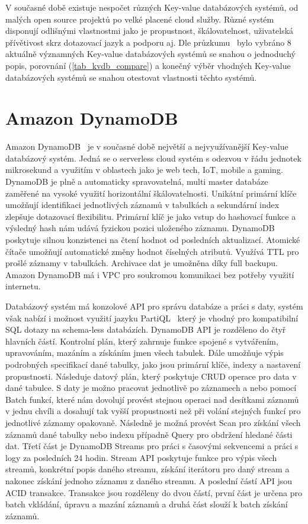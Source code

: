 \documentclass[czech,master,dept460,male,csharp,cpdeclaration]{diploma}
\begin{document}
	V současné době existuje nespočet různých Key-value databázových systémů, od malých open source projektů po velké placené cloud služby. Různé systém disponují odlišnými vlastnostmi jako je propustnost, škálovatelnost, uživatelská přívětivost skrz dotazovací jazyk a podporu aj. Dle průzkumu~\cite{predictiveanalyticstoday,g2,db-engineers-ranking} bylo vybráno 8 aktuálně významných Key-value databázových systémů se snahou o jednoduchý popis, porovnání (\ref{tab_kvdb_compare}) a konečný výběr vhodných Key-value databázových systémů se snahou otestovat vlastnosti těchto systémů.
	
	\section{Amazon DynamoDB}
	
	Amazon DynamoDB~\cite{dynamodb} je v současné době největší a nejvyužívanější Key-value databázový systém. Jedná se o serverless cloud systém s odezvou v řádu jednotek mikrosekund a využitím v oblastech jako je web tech, IoT, mobile a gaming. DynamoDB je plně a automaticky spravovatelná, multi master databáze zaměřené na vysoké využití horizontální škálovatelnosti. Unikátní primární klíče umožňují identifikaci jednotlivých záznamů v tabulkách a sekundární index zlepšuje dotazovací flexibilitu. Primární klíč je jako vstup do hashovací funkce a výsledný hash nám udává fyzickou pozici uloženého záznamu. DynamoDB poskytuje silnou konzistenci na čtení hodnot od posledních aktualizací. Atomické čítače umožňují automatické změny hodnot číselných atributů. Využívá TTL pro prošlé záznamy v tabulkách. Archivace dat je umožněna díky full backupu. Amazon DynamoDB má i VPC pro soukromou komunikaci bez potřeby využití internetu.
	
	Databázový systém má konzolové API pro správu databáze a práci s daty, systém však nabízí i možnost využití jazyku PartiQL~\cite{partiql} který je vhodný pro kompatibilní SQL dotazy na schema-less databázích. DynamoDB API je rozděleno do čtyř hlavních částí. Kontrolní plán, který zahrnuje funkce spojené s vytvářením, upravováním, mazáním a získáním jmen všech tabulek. Dále umožňuje výpis podrobných specifikací dané tabulky, jako jsou primární klíče, indexy a nastavení propustnosti. Následuje datový plán, který poskytuje CRUD operace pro data v dané tabulce. S daty je možno pracovat jednotlivě po záznamech a nebo pomocí Batch funkcí, které nám dovolují provést stejnou operaci nad desítkami záznamů v jednu chvíli a dosahují tak vyšší propustnosti než při volání stejných funkcí pro jednotlivé záznamy opakovaně. Následně je možná provést Scan pro získání všech záznamů dané tabulky nebo indexu případně Query pro obdržení hledané části dat. Třetí část je DynamoDB Streams pro práci s časovými sekvencemi a práci s logy za posledních 24 hodin. Stream API poskytuje funkce pro výpis všech streamů, konkrétní popis daného streamu, získání iterátoru pro daný stream a nakonec získání jednoho záznamu z daného streamu. A poslední částí API jsou ACID transakce. Transakce jsou rozděleny do dvou částí, první část je určena pro batch vkládání, úpravu a mazání záznamů a druhá část slouží k batch získání záznamů.
		
\end{document}
